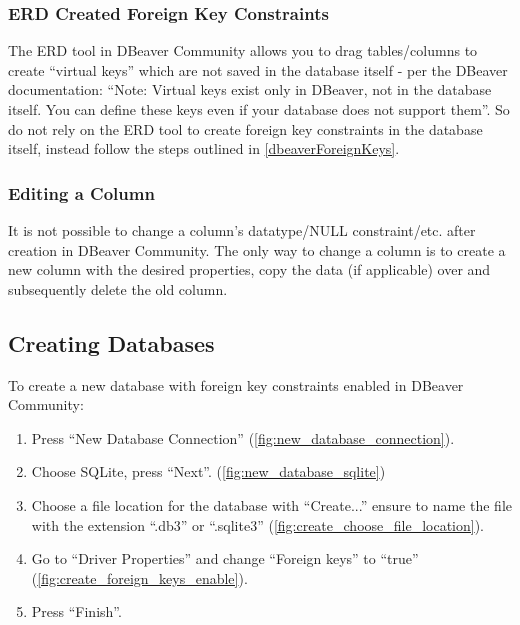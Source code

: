 \documentclass[a4paper,11pt,oneside]{article}
\begin{document}
\begin{sloppypar}
\subsubsection{ERD Created Foreign Key Constraints}
\label{dbeaverERDCreatedForeignKeys}
The ERD tool in DBeaver Community allows you to drag tables/columns to create ``virtual keys'' which are not saved in the database itself - per the DBeaver documentation:
``Note: Virtual keys exist only in DBeaver, not in the database itself. You can define these keys even if your database does not support them''. \cite{dbeaver_virtual_keys} So do not rely on the ERD tool to create foreign key constraints in the database itself, instead follow the steps outlined in \autoref{dbeaverForeignKeys}.

\subsubsection{Editing a Column}
\label{dbeaverEditingColumn}
It is not possible to change a column's datatype/NULL constraint/etc. after creation in DBeaver Community. The only way to change a column is to create a new column with the desired properties, copy the data (if applicable) over and subsequently delete the old column.


\subsection{Creating Databases}
\label{dbeaverCreatingDatabase}
To create a new database with foreign key constraints enabled in DBeaver Community:
\begin{enumerate}
    \item Press ``New Database Connection'' (\autoref{fig:new_database_connection}).
    \item Choose SQLite, press ``Next''. (\autoref{fig:new_database_sqlite})
    \item Choose a file location for the database with ``Create...'' ensure to name the file with the extension ``.db3'' or ``.sqlite3'' (\autoref{fig:create_choose_file_location}).
    \item Go to ``Driver Properties'' and change ``Foreign keys'' to ``true'' (\autoref{fig:create_foreign_keys_enable}).
    \item Press ``Finish''.
\end{enumerate}


\end{sloppypar}
\end{document}
